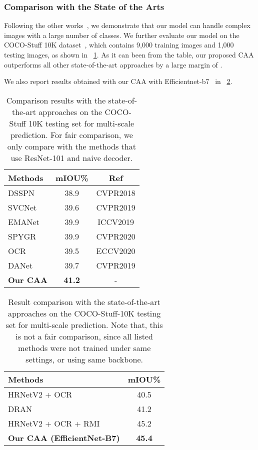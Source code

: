 \documentclass[journal]{IEEEtran}
\begin{document}
\subsubsection{Comparison with the State of the Arts}
Following the other works~\cite{cEMANet, cOCR, cDualAttention}, we demonstrate that our model can handle complex images with a large number of classes. 
We further evaluate our model on the COCO-Stuff 10K dataset~\cite{cCocoStuff}, which contains 9,000 training images and 1,000 testing images, as shown in \tablename{~\ref{tabCocostuffSOTA}}.
As it can been from the table, our proposed CAA outperforms all other state-of-the-art approaches by a large margin of .

We also report results obtained with our CAA with Efficientnet-b7~\cite{cEfficientNet} in \tablename{~\ref{tabCocostuffFree}}. 



\begin{table}[t]
	\centering
\caption{Comparison results with  the state-of-the-art approaches on the COCO-Stuff 10K testing set for multi-scale prediction. For fair comparison, we only compare with the methods that use ResNet-101 and naive decoder.}
	\begin{tabular}{l|c|c}
		\toprule[1pt]
		\rule{0pt}{2ex} Methods & mIOU\% & Ref \\
		\midrule[0.5pt]
		\midrule[0.5pt]
		DSSPN~\cite{cDSSPN} & 38.9 & CVPR2018 \\
		SVCNet~\cite{cSVCNet} & 39.6 & CVPR2019 \\
		EMANet~\cite{cEMANet} & 39.9 & ICCV2019 \\
		SPYGR~\cite{cSPYGR} & 39.9 & CVPR2020 \\
		OCR~\cite{cOCR} & 39.5 & ECCV2020 \\
		\midrule[0.5pt]
		DANet~\cite{cDualAttention} & 39.7 & CVPR2019\\
		\midrule[0.5pt]
		\textbf{Our CAA} & \textbf{41.2} & - \\
		\bottomrule[0.5pt]
	\end{tabular}
	
	\label{tabCocostuffSOTA}
\end{table}


\begin{table}[t]
	\centering
\caption{Result comparison with the state-of-the-art approaches on the COCO-Stuff-10K testing set for multi-scale prediction. Note that, this is not a fair comparison, since all listed methods were not trained under same settings, or using same backbone. }
	\begin{tabular}{l|c}
		\toprule[1pt]
		\rule{0pt}{2ex} Methods & mIOU\% \\
		\midrule[0.5pt]
		\midrule[0.5pt]
		HRNetV2 + OCR ~\cite{cSVCNet} & 40.5\\
		DRAN & 41.2 \\
		HRNetV2 + OCR + RMI ~\cite{cOCR} & 45.2 \\
		\midrule[0.5pt]
		\textbf{Our CAA (EfficientNet-B7)} & \textbf{45.4}\\
		\bottomrule[1pt]
	\end{tabular}
	\label{tabCocostuffFree}
\end{table}
\end{document}
